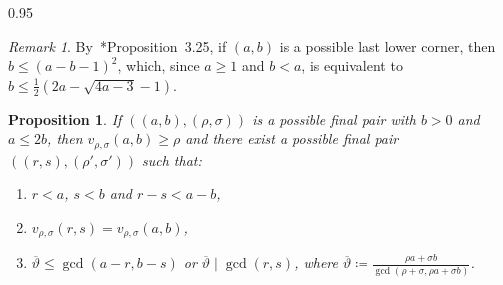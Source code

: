 \documentclass[reqno,a4paper,twoside]{amsart}
\newtheorem{proposition}[theorem]{Proposition}
\theoremstyle{definition}
\theoremstyle{remark}
\newtheorem{remark}[theorem]{Remark}
\newcommand{\ov}{\overline}
\begin{document}
\begin{spacing}{0.95}
\begin{remark}
By~\cite{GGV2}*{Proposition~3.25}, if $(a,b)$ is a possible last lower corner, then $b\le (a-b-1)^2$, which, since $a\ge 1$ and $b<a$, is equivalent to $b\le \frac{1}{2} \left(2 a-\sqrt{4 a-3}-1\right)$. %
\end{remark}



\begin{proposition}\label{cotasjacobiano2.12}
If $((a,b),(\rho,\sigma))$ is a possible final pair with $b\!>\!0$ and $a\!\le\!2b$, then \hbox{$v_{\rho,\sigma}(a,b)\!\ge\!\rho$} and there exist a possible final pair $((r,s),(\rho',\sigma'))$ such that:

\begin{enumerate}[itemsep=0.5ex,topsep=0.5ex]

\item $r<a$, $s<b$ and $r-s<a-b$,

\item $v_{\rho,\sigma}(r,s) = v_{\rho,\sigma}(a,b)$,


\item $\ov{\vartheta} \leq \gcd(a - r, b - s)$ or $\ov{\vartheta}\mid \gcd(r,s)$, where $\ov{\vartheta}\coloneqq \frac{\rho a+\sigma b}{\gcd(\rho+\sigma,\rho a+\sigma b)}$.

\end{enumerate}
\end{proposition}


\end{spacing}
\end{document}
